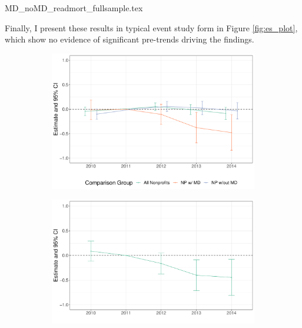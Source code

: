 \documentclass[12pt]{article}
\begin{document}
{MD_noMD_readmort_fullsample.tex}

Finally, I present these results in typical event study form in Figure \ref{fig:es_plot}, which show no evidence of significant pre-trends driving the findings. 

\begin{figure}[ht!]
     \caption{TWFE Event Study Results}
     \centering
          \begin{subfigure}[b]{0.45\textwidth}
         \centering
         \caption{}
         \includegraphics[width=\textwidth]{Objects/read_forprofit_es_graph.pdf}
         \label{fig:es_plota}
     \end{subfigure}%
     \hfill
     \begin{subfigure}[b]{0.45\textwidth}
         \centering
         \caption{}
         \includegraphics[width=\textwidth]{Objects/read_MD_es_graph.pdf}
         \label{fig:es_plotb}
     \end{subfigure}%

\end{figure}
\end{document}
